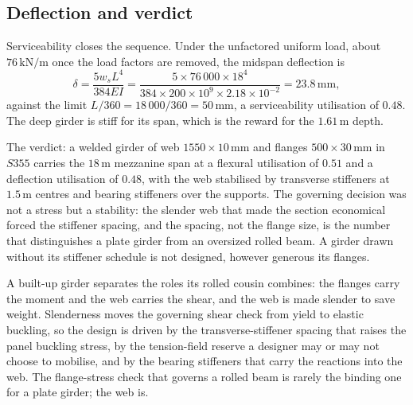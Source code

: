 \subsection{Deflection and verdict}

Serviceability closes the sequence. Under the unfactored uniform load,
about $76\,\text{kN}/\text{m}$ once the load factors are removed, the
midspan deflection is
\[
\delta = \frac{5 w_s L^4}{384 E I}
= \frac{5 \times 76\,000 \times 18^4}{384 \times 200 \times 10^9
\times 2.18 \times 10^{-2}}
= 23.8\,\si{\milli\meter},
\]
against the limit $L/360 = 18\,000/360 = 50\,\si{\milli\meter}$, a
serviceability utilisation of $0.48$. The deep girder is stiff for its
span, which is the reward for the $1.61\,\si{\meter}$ depth.

The verdict: a welded girder of web $1550 \times 10\,\si{\milli\meter}$
and flanges $500 \times 30\,\si{\milli\meter}$ in $S355$ carries the
$18\,\si{\meter}$ mezzanine span at a flexural utilisation of $0.51$ and
a deflection utilisation of $0.48$, with the web stabilised by
transverse stiffeners at $1.5\,\si{\meter}$ centres and bearing
stiffeners over the supports. The governing decision was not a stress
but a stability: the slender web that made the section economical forced
the stiffener spacing, and the spacing, not the flange size, is the
number that distinguishes a plate girder from an oversized rolled beam.
A girder drawn without its stiffener schedule is not designed, however
generous its flanges.

\begin{principle}
A built-up girder separates the roles its rolled cousin combines: the
flanges carry the moment and the web carries the shear, and the web is
made slender to save weight. Slenderness moves the governing shear check
from yield to elastic buckling, so the design is driven by the
transverse-stiffener spacing that raises the panel buckling stress, by
the tension-field reserve a designer may or may not choose to mobilise,
and by the bearing stiffeners that carry the reactions into the web. The
flange-stress check that governs a rolled beam is rarely the binding one
for a plate girder; the web is.
\end{principle}

